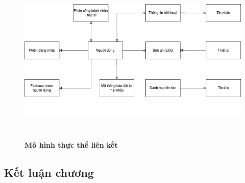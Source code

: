 \begin{figure}[H]
  \centering
  \includegraphics[width=15cm,height=8cm]{Images/system/fmECG_connection_entity.png}
  \caption[Mô hình thực thể liên kết]{\bfseries \fontsize{12pt}{0pt}
  \selectfont Mô hình thực thể liên kết}
  \label{ttlk} %
\end{figure}

\subsection{Kết luận chương}

\newpage
